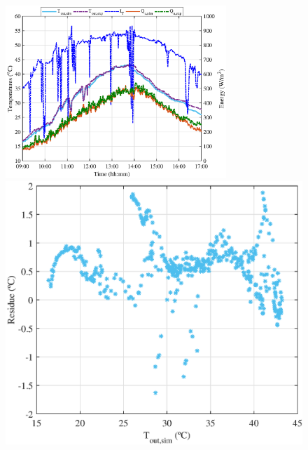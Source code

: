 
\begin{figure}[ht!]
\begin{minipage}{0.60\columnwidth}
		\includegraphics[width=0.99\columnwidth,height=65mm]{figs/0055-3.eps}
	\end{minipage}
	\begin{minipage}{0.39\columnwidth}
		\includegraphics[scale=0.5,width=1.0\columnwidth]{figs/0055-residue-5.eps}

\end{minipage}
\end{figure}
